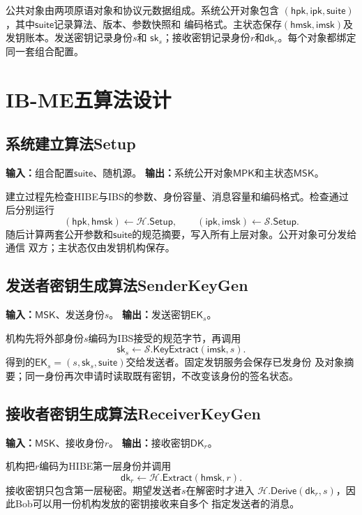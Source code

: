 公共对象由两项原语对象和协议元数据组成。系统公开对象包含
$(\mathsf{hpk},\mathsf{ipk},\mathsf{suite})$，其中$\mathsf{suite}$记录算法、版本、参数快照和
编码格式。主状态保存$(\mathsf{hmsk},\mathsf{imsk})$及发钥账本。发送密钥记录身份$s$和
$\mathsf{sk}_s$；接收密钥记录身份$r$和$\mathsf{dk}_r$。每个对象都绑定同一套组合配置。

\section{IB-ME五算法设计}

\subsection{系统建立算法Setup}

\textbf{输入：}组合配置$\mathsf{suite}$、随机源。\quad
\textbf{输出：}系统公开对象$\mathsf{MPK}$和主状态$\mathsf{MSK}$。

建立过程先检查HIBE与IBS的参数、身份容量、消息容量和编码格式。检查通过后分别运行
\[
 (\mathsf{hpk},\mathsf{hmsk})\leftarrow\mathcal H.\mathsf{Setup},\qquad
 (\mathsf{ipk},\mathsf{imsk})\leftarrow\mathcal S.\mathsf{Setup}.
\]
随后计算两套公开参数和$\mathsf{suite}$的规范摘要，写入所有上层对象。公开对象可分发给通信
双方；主状态仅由发钥机构保存。

\subsection{发送者密钥生成算法SenderKeyGen}

\textbf{输入：}$\mathsf{MSK}$、发送身份$s$。\quad
\textbf{输出：}发送密钥$\mathsf{EK}_s$。

机构先将外部身份$s$编码为IBS接受的规范字节，再调用
\[
  \mathsf{sk}_s\leftarrow
  \mathcal S.\mathsf{KeyExtract}(\mathsf{imsk},s).
\]
得到的$\mathsf{EK}_s=(s,\mathsf{sk}_s,\mathsf{suite})$交给发送者。固定发钥服务会保存已发身份
及对象摘要；同一身份再次申请时读取既有密钥，不改变该身份的签名状态。

\subsection{接收者密钥生成算法ReceiverKeyGen}

\textbf{输入：}$\mathsf{MSK}$、接收身份$r$。\quad
\textbf{输出：}接收密钥$\mathsf{DK}_r$。

机构把$r$编码为HIBE第一层身份并调用
\[
  \mathsf{dk}_r\leftarrow
  \mathcal H.\mathsf{Extract}(\mathsf{hmsk},r).
\]
接收密钥只包含第一层秘密。期望发送者$s$在解密时才进入
$\mathcal H.\mathsf{Derive}(\mathsf{dk}_r,s)$，因此Bob可以用一份机构发放的密钥接收来自多个
指定发送者的消息。

